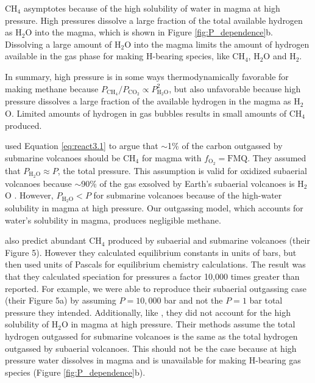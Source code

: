CH$_4$ asymptotes because of the high solubility of water in magma at high pressure. High pressures dissolve a large fraction of the total available hydrogen as H$_2$O into the magma, which is shown in Figure \ref{fig:P_dependence}b. Dissolving a large amount of H$_2$O into the magma limits the amount of hydrogen available in the gas phase for making H-bearing species, like CH$_4$, H$_2$O and H$_2$. 

In summary, high pressure is in some ways thermodynamically favorable for making methane because $P_{\mathrm{CH_4}}/P_{\mathrm{CO_2}} \propto P_\mathrm{H_2O}^2$, but also unfavorable because high pressure dissolves a large fraction of the available hydrogen in the magma as H$_2$O. Limited amounts of hydrogen in gas bubbles results in small amounts of CH$_4$ produced.

\citet{Kasting1998} used Equation \eqref{eq:react3.1} to argue that $\sim$1\% of the carbon outgassed by submarine volcanoes should be CH$_4$ for magma with $f_\mathrm{O_2} = \mathrm{FMQ}$. They assumed that $P_\mathrm{H_2O} \approx P$, the total pressure. This assumption is valid for oxidized subaerial volcanoes because $\sim$90\% of the gas exsolved by Earth's subaerial volcanoes is H$_2$O \citep[p. 203]{Catling_2017}. However, $P_\mathrm{H_2O} < P$ for submarine volcanoes because of the high-water solubility in magma at high pressure. Our outgassing model, which accounts for water's solubility in magma, produces negligible methane.

\citet{Li_2004} also predict abundant CH$_4$ produced by subaerial and submarine volcanoes (their Figure 5). However they calculated equilibrium constants in units of bars, but then used units of Pascals for equilibrium chemistry calculations. The result was that they calculated speciation for pressures a factor 10,000 times greater than reported. For example, we were able to reproduce their subaerial outgassing case (their Figure 5a) by assuming $P=10,000$ bar and not the $P=1$ bar total pressure they intended. Additionally, like \citet{Kasting1998}, they did not account for the high solubility of H$_2$O in magma at high pressure. Their methods assume the total hydrogen outgassed for submarine volcanoes is the same as the total hydrogen outgassed by subaerial volcanoes. This should not be the case because at high pressure water dissolves in magma and is unavailable for making H-bearing gas species (Figure \ref{fig:P_dependence}b).

